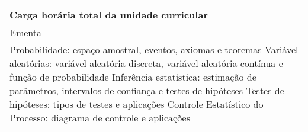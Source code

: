 \begin{quadro}[h!]
\begin{tabular}{|p{3cm} p{2cm} p{3cm} p{2cm} p{3cm} p{2cm}|}
\multicolumn{5}{|p{13cm}|}{\cellcolor{blue1} Carga horária total da unidade curricular} & \multicolumn{1}{p{1cm}|}{\raggedleft 60	}\\\hline
\multicolumn{6}{|p{15cm}|}{\cellcolor{blue1} Ementa} \\\hline
\hline\multicolumn{6}{|p{15cm}|}{\scriptsize Probabilidade: espaço amostral, eventos, axiomas e teoremas Variável aleatórias: variável aleatória discreta, variável aleatória contínua e função de probabilidade Inferência estatística: estimação de parâmetros, intervalos de confiança e testes de hipóteses Testes de hipóteses: tipos de testes e aplicações Controle Estatístico do Processo: diagrama de controle e aplicações}\\\hline
\hline
	\end{tabular}
\end{quadro}
